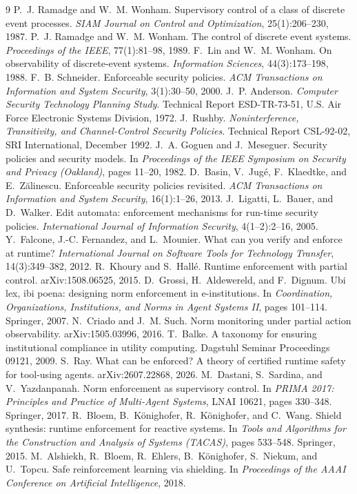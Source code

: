 \documentclass[11pt,a4paper]{article}  \usepackage{mdframed} \usepackage{graphicx}
\begin{document}
\begin{thebibliography}{9}  P.~J. Ramadge and W.~M. Wonham. Supervisory control of a class of discrete event
processes. \emph{SIAM Journal on Control and Optimization}, 25(1):206--230, 1987.  P.~J. Ramadge and W.~M.
Wonham. The control of discrete event systems. \emph{Proceedings of the IEEE}, 77(1):81--98, 1989.  F.~Lin and
W.~M. Wonham. On observability of discrete-event systems. \emph{Information Sciences}, 44(3):173--198, 1988.
 F.~B. Schneider. Enforceable security policies. \emph{ACM Transactions on Information and System
Security}, 3(1):30--50, 2000.  J.~P. Anderson. \emph{Computer Security Technology Planning Study}.
Technical Report ESD-TR-73-51, U.S. Air Force Electronic Systems Division, 1972.  J.~Rushby.
\emph{Noninterference, Transitivity, and Channel-Control Security Policies}. Technical Report CSL-92-02, SRI International,
December 1992.  J.~A. Goguen and J.~Meseguer. Security policies and security models. In \emph{Proceedings of
the IEEE Symposium on Security and Privacy (Oakland)}, pages 11--20, 1982.
 D.~Basin, V.~Jug\'e, F.~Klaedtke, and E.~Z\u{a}linescu. Enforceable security policies revisited.
\emph{ACM Transactions on Information and System Security}, 16(1):1--26, 2013.
 J.~Ligatti, L.~Bauer, and D.~Walker. Edit automata: enforcement mechanisms for run-time security policies.
\emph{International Journal of Information Security}, 4(1--2):2--16, 2005.
 Y.~Falcone, J.-C. Fernandez, and L.~Mounier. What can you verify and enforce at runtime?
\emph{International Journal on Software Tools for Technology Transfer}, 14(3):349--382, 2012.
 R.~Khoury and S.~Hall\'e. Runtime enforcement with partial control. arXiv:1508.06525, 2015.
 D.~Grossi, H.~Aldewereld, and F.~Dignum. Ubi lex, ibi poena: designing norm enforcement in e-institutions.
In \emph{Coordination, Organizations, Institutions, and Norms in Agent Systems II}, pages 101--114. Springer, 2007.
 N.~Criado and J.~M. Such. Norm monitoring under partial action observability. arXiv:1505.03996, 2016.
 T.~Balke. A taxonomy for ensuring institutional compliance in utility computing. Dagstuhl Seminar
Proceedings 09121, 2009.
 S.~Ray. What can be enforced? A theory of certified runtime safety for tool-using agents.
arXiv:2607.22868, 2026.
 M.~Dastani, S.~Sardina, and V.~Yazdanpanah. Norm enforcement as supervisory control. In \emph{PRIMA 2017:
Principles and Practice of Multi-Agent Systems}, LNAI 10621, pages 330--348. Springer, 2017.
 R.~Bloem, B.~K\"onighofer, R.~K\"onighofer, and C.~Wang. Shield synthesis: runtime enforcement for reactive
systems. In \emph{Tools and Algorithms for the Construction and Analysis of Systems (TACAS)}, pages 533--548. Springer, 2015.
 M.~Alshiekh, R.~Bloem, R.~Ehlers, B.~K\"onighofer, S.~Niekum, and U.~Topcu. Safe reinforcement learning
via shielding. In \emph{Proceedings of the AAAI Conference on Artificial Intelligence}, 2018. \end{thebibliography}
\end{document}

